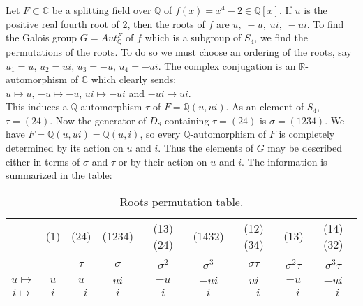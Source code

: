 Let \(F \subset \mathbb{C}\) be a splitting field over \(\mathbb{Q}\) of \(f(x)=x^4-2 \in \mathbb{Q}[x]\). If \(u\) is the positive real fourth root of 2, then the roots of \(f\) are \(u,\; -u,\; ui,\; -ui\). To find the  Galois group \(G = Aut_{\mathbb{Q}}^F\) of \(f\) which is a subgroup of \(S_4\), we find the permutations of the roots. To do so  we must choose an ordering of the roots, say \(u_1=u\), \(u_2=ui\), \(u_3=-u\), \(u_4= -ui\). The complex conjugation is an \(\mathbb{R}\)-automorphism of \(\mathbb{C}\) which clearly sends:\\
\(u \mapsto u\), \(-u \mapsto -u\), \(ui \mapsto -ui\) and \(-ui \mapsto ui\). \\
This induces a \(\mathbb{Q}\)-automorphism \(\tau\) of \(F=\mathbb{Q}(u,ui)\). As an element of \(S_4\), \(\tau=(24)\).
Now the generator of \(D_8\) containing \(\tau = (24)\) is \(\sigma = (1234)\). We have \(F=\mathbb{Q}(u,ui)=\mathbb{Q}(u,i)\),
so every \(\mathbb{Q}\)-automorphism of \(F\) is completely determined by its action on \(u\) and \(i\). Thus the elements of \(G\)
may be described either in terms of \(\sigma\) and \(\tau\) or by their action on \(u\) and \(i\). The information is summarized in the table:\\[1mm]
\begin{table}[h!]
\begin{tabular}{|c|c|c|c|c|c|c|c|c|}
  \hline
  \ & (1) & (24) & (1234) & (13)(24) & (1432) & (12)(34) & (13) & (14)(32) \\
  \ &  & \(\tau\)  & \(\sigma\) & \({\sigma}^2\) & \({\sigma}^3\) & \(\sigma \tau\) & \({\sigma}^2 \tau\) & \({\sigma}^3 \tau\) \\
  \hline
  \(u \mapsto\) & \(u\) & \(u\) & \(ui\) & \(-u\) & \(-ui\) & \(ui\) & \(-u\) & \(-ui\) \\
  \(i \mapsto\) & \(i\) & \(-i\) & \(i\) & \(i\) & \(i\) & \(-i\) & \(-i\) & \(-i\) \\
  \hline
\end{tabular}
\caption{\footnotesize Roots permutation table.}
\end{table}


